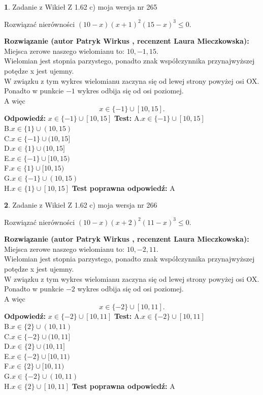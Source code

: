 \documentclass[12pt, a4paper]{article}
\theoremstyle{definition} %
\newtheorem{zad}{}
\newcommand{\zadStart}[1]{\begin{zad}#1\newline}
\newcommand{\zadStop}{\end{zad}}
\newcommand{\rozwStart}[2]{\noindent \textbf{Rozwiązanie (autor #1 , recenzent #2): }\newline}
\newcommand{\rozwStop}{\newline}
\newcommand{\odpStart}{\noindent \textbf{Odpowiedź:}\newline}
\newcommand{\odpStop}{\newline}
\newcommand{\testStart}{\noindent \textbf{Test:}\newline}
\newcommand{\testStop}{\newline}
\newcommand{\kluczStart}{\noindent \textbf{Test poprawna odpowiedź:}\newline}
\newcommand{\kluczStop}{\newline}
\begin{document}
\zadStart{Zadanie z Wikieł Z 1.62 c) moja wersja nr 265}

Rozwiązać nierówności $(10-x)(x+1)^{2}(15-x)^{3}\le0$.
\zadStop
\rozwStart{Patryk Wirkus}{Laura Mieczkowska}
Miejsca zerowe naszego wielomianu to: $10, -1, 15$.\\
Wielomian jest stopnia parzystego, ponadto znak współczynnika przy\linebreak najwyższej potędze x jest ujemny.\\ W związku z tym wykres wielomianu zaczyna się od lewej strony powyżej osi OX.\\
Ponadto w punkcie $-1$ wykres odbija się od osi poziomej.\\
A więc $$x \in \{-1\} \cup [10,15].$$
\rozwStop
\odpStart
$x \in \{-1\} \cup [10,15]$
\odpStop
\testStart
A.$x \in \{-1\} \cup [10,15]$\\
B.$x \in \{1\} \cup (10,15)$\\
C.$x \in \{-1\} \cup (10,15]$\\
D.$x \in \{1\} \cup (10,15]$\\
E.$x \in \{-1\} \cup [10,15)$\\
F.$x \in \{1\} \cup [10,15)$\\
G.$x \in \{-1\} \cup (10,15)$\\
H.$x \in \{1\} \cup [10,15]$
\testStop
\kluczStart
A
\kluczStop



\zadStart{Zadanie z Wikieł Z 1.62 c) moja wersja nr 266}

Rozwiązać nierówności $(10-x)(x+2)^{2}(11-x)^{3}\le0$.
\zadStop
\rozwStart{Patryk Wirkus}{Laura Mieczkowska}
Miejsca zerowe naszego wielomianu to: $10, -2, 11$.\\
Wielomian jest stopnia parzystego, ponadto znak współczynnika przy\linebreak najwyższej potędze x jest ujemny.\\ W związku z tym wykres wielomianu zaczyna się od lewej strony powyżej osi OX.\\
Ponadto w punkcie $-2$ wykres odbija się od osi poziomej.\\
A więc $$x \in \{-2\} \cup [10,11].$$
\rozwStop
\odpStart
$x \in \{-2\} \cup [10,11]$
\odpStop
\testStart
A.$x \in \{-2\} \cup [10,11]$\\
B.$x \in \{2\} \cup (10,11)$\\
C.$x \in \{-2\} \cup (10,11]$\\
D.$x \in \{2\} \cup (10,11]$\\
E.$x \in \{-2\} \cup [10,11)$\\
F.$x \in \{2\} \cup [10,11)$\\
G.$x \in \{-2\} \cup (10,11)$\\
H.$x \in \{2\} \cup [10,11]$
\testStop
\kluczStart
A
\kluczStop
\end{document}
